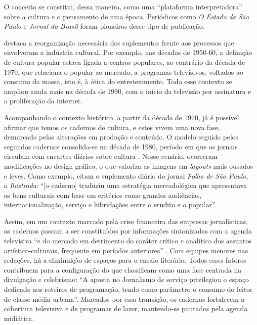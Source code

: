 \documentclass[portuguese]{textolivre}
\begin{document}
O conceito se constitui, dessa maneira, como uma “plataforma interpretadora” sobre a cultura e o pensamento de uma época. Periódicos como \textit{O Estado de São Paulo} e \textit{Jornal do Brasil} foram pioneiros desse tipo de publicação.

\textcite{lima2013} destaca a reorganização necessária dos suplementos frente aos processos que envolveram a indústria cultural. Por exemplo, nas décadas de 1950-60, a definição de cultura popular estava ligada a centros populares, ao contrário da década de 1970, que relaciona o popular ao mercado, a programas televisivos, voltados ao consumo da massa, isto é, à ótica do entretenimento. Todo esse contexto se ampliou ainda mais na década de 1990, com o início da televisão por assinatura e a proliferação da internet.

Acompanhando o contexto histórico, a partir da década de 1970, já é possível afirmar que temos os cadernos de cultura, e estes vivem uma nova fase, demarcada pelas alterações em produção e conteúdo. O modelo seguido pelos segundos cadernos consolida-se na década de 1980, período em que os jornais circulam com encartes diários sobre cultura \cite{gadini2009}. Nesse cenário, ocorreram modificações no design gráfico, o que valoriza as imagens em \textit{layouts} mais ousados e leves. Como exemplo, \textcite[p. 192]{golin2010} citam o suplemento diário do jornal \textit{Folha de São Paulo}, a \textit{Ilustrada}: “[o caderno] traduziu uma estratégia mercadológica que apresentava os bens culturais com base em critérios como grandes audiências, internacionalização, serviço e hibridações entre o erudito e o popular”.

Assim, em um contexto marcado pela crise financeira das empresas jornalísticas, os cadernos passam a ser constituídos por informações sintonizadas com a agenda televisiva “e do mercado em detrimento do caráter crítico e analítico dos assuntos artístico-culturais, frequente em períodos anteriores” \cite[p. 191-192]{golin2010}. Com equipes menores nas redações, há a diminuição de espaços para o ensaio literário. Todos esses fatores contribuem para a configuração do que \textcite[p. 191-192]{golin2010} classificam como uma fase centrada na divulgação e celebrismo: “A aposta no Jornalismo de serviço privilegiou o espaço dedicado aos roteiros de programação, tendo como parâmetro o consumo do leitor de classe média urbana”. Marcados por essa transição, os cadernos fortalecem a cobertura televisiva e de programas de lazer, mantendo-se pautados pela agenda midiática.
\end{document}
